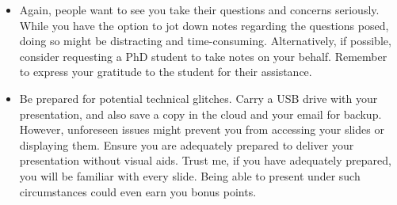 \documentclass[12pt]{article}
\begin{document}
\begin{itemize}
\begin{itemize}
\end{itemize}
\item Again, people want to see you take their questions and concerns seriously. While you have the option to jot down notes regarding the questions posed, doing so might be distracting and time-consuming. Alternatively, if possible, consider requesting a PhD student to take notes on your behalf. Remember to express your gratitude to the student for their assistance.
\item Be prepared for potential technical glitches. Carry a USB drive with your presentation, and also save a copy in the cloud and your email for backup. However, unforeseen issues might prevent you from accessing your slides or displaying them. Ensure you are adequately prepared to deliver your presentation without visual aids. Trust me, if you have adequately prepared, you will be familiar with every slide. Being able to present under such circumstances could even earn you bonus points.
\end{itemize}
\end{document}
